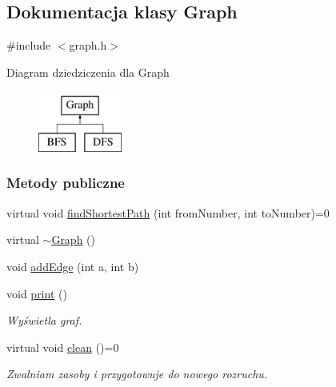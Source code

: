 \hypertarget{class_graph}{\subsection{Dokumentacja klasy Graph}
\label{class_graph}
}


{\ttfamily \#include $<$graph.\-h$>$}

Diagram dziedziczenia dla Graph\begin{figure}[H]
\begin{center}
\leavevmode
\includegraphics[height=2.000000cm]{class_graph}
\end{center}
\end{figure}
\subsubsection*{Metody publiczne}
\begin{DoxyCompactItemize}
\item 
virtual void \hyperlink{class_graph_adf2b7f7e78c0ac66f7f604021133561e}{find\-Shortest\-Path} (int from\-Number, int to\-Number)=0
\item 
virtual \hyperlink{class_graph_a1621cd1ffcf6a135cbc7e039c305627b}{$\sim$\-Graph} ()
\item 
void \hyperlink{class_graph_aca8b8f4b419f1495b6fe881e53811098}{add\-Edge} (int a, int b)
\item 
void \hyperlink{class_graph_a2ecf3dd3c4897aa924da8e5c221a8509}{print} ()
\begin{DoxyCompactList}\small\item\em Wyświetla graf. \end{DoxyCompactList}\item 
virtual void \hyperlink{class_graph_a957781c55ace92dc6703b8d890b73ca7}{clean} ()=0
\begin{DoxyCompactList}\small\item\em Zwalniam zasoby i przygotowuje do nowego rozruchu. \end{DoxyCompactList}\end{DoxyCompactItemize}
